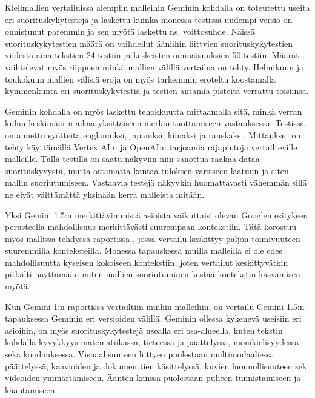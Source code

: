 Kielimallien vertailuissa aiempiin malleihin Geminin kohdalla on toteutettu
useita eri suorituskykytestejä ja laskettu kuinka monessa testissä uudempi
versio on onnistunut paremmin ja sen myötä laskettu ns. voittosuhde. Näissä
suorituskykytestien määrä on vaihdellut ääniihin liittvien suorituskykytestien
viidestä aina tekstien 24 testiin ja keskeisten ominaisuuksien 50 testiin.
Määrät vaihtelevat myös riippuen minkä mallien välillä vertailua on tehty.
Helmikuun ja toukokuun mallien välisiä eroja on myös tarkemmin eroteltu
koostamalla kymmenkunta eri suorituskykytestiä ja testien antamia pisteitä
verrattu toisiinsa. \parencite{googleDeepmindGeminiv1_5report}

Geminin kohdalla on myös laskettu tehokkuutta mittaamalla sitä, minkä verran
kuluu keskimäärin aikaa yksittäiseen merkin tuottamiseen vastauksessa. Testissä
on annettu syötteitä englanniksi, japaniksi, kiinaksi ja ranskaksi. Mittaukset
on tehty käyttämällä Vertex AI:n ja OpenAI:n tarjoamia rajapintoja vertailteville
malleille. \parencite{googleDeepmindGeminiv1_5report} Tällä testillä on saatu
näkyviin niin sanottua raakaa dataa suorituskyvystä, mutta ottamatta kantaa
tuloksen varsiseen laatuun ja siten mallin suoriutumiseen. Vastaavia testejä
näkyykin huomattavasti vähemmän sillä ne eivät välttämättä yksinään kerra
malleista mitään.

Yksi Gemini 1.5:n merkittävimmistä asioista vaikuttaisi olevan Googlen
esityksen \parencite{googleKeynote2024} perusteella mahdollisuus merkittävästi
suurempaan kontekstiin. Tätä korostuu myös mallissa tehdyssä raportissa
\parencite{googleDeepmindGeminiv1_5report}, jossa vertailu keskittyy paljon
toimivuuteen suuremmilla konteksteilla. Monessa tapauskessa muilla malleilla ei
ole edes mahdollisuutta kyseisen kokoiseen kontekstiin, joten vertailut
keskittyvätkin pitkälti näyttämään miten mallien suoriutuminen kestää
kontekstin kasvamisen myötä.

Kun Gemini 1:n raportissa \parencite{googleDeepmindGeminiv1report} vertailtiin
muihin malleihin, on vertailu Gemini 1.5:n
\parencite{googleDeepmindGeminiv1report} tapauksessa Geminin eri versioiden
välillä. Geminin ollessa kykenevä useisiin eri asioihin, on myös
suorituskykytestejä usealla eri osa-alueella, kuten tekstin kohdalla
kyvykkyys matematiikassa, tieteessä ja päättelyssä, monikielisyydessä,
sekä koodauksessa. Visuaalisuuteen liittyen puolestaan multimodaaliessa
päättelyssä, kaavioiden ja dokumenttien käsittelyssä, kuvien luonnollisuuteen
sek videoiden ymmärtämiseen. Äänten kanssa puolestaan puheen tunnistamiseen ja
kääntämiseen.

